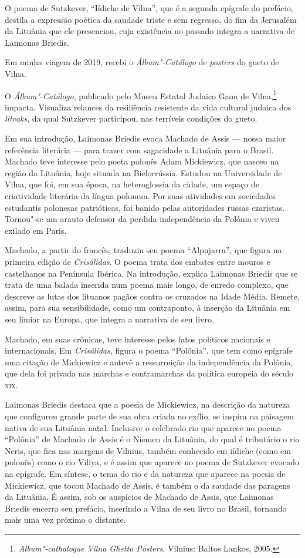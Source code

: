 O poema de Sutzkever, ``Iídiche de Vilna'', que é a segunda epígrafe do
prefácio, destila a expressão poética da saudade triste e sem regresso,
do fim da Jerusalém da Lituânia que ele presenciou, cuja existência no
passado integra a narrativa de Laimonas Briedis.

Em minha viagem de 2019, recebi o \emph{Álbum"-Catálogo} de
\emph{posters} do gueto de Vilna.

O \emph{Álbum"-Catálogo}, publicado pelo Museu Estatal Judaico Gaon de
Vilna,\footnote{\emph{Album"-cathalogue Vilna Ghetto Posters}. Vilnius:
  Baltos Lankos, 2005.} impacta. Visualiza relances da resiliência
resistente da vida cultural judaica dos \emph{litvaks}, da qual
Sutzkever participou, nas terríveis condições do gueto.

Em sua introdução, Laimonas Briedis evoca Machado de Assis --- nossa
maior referência literária --- para trazer com sagacidade a Lituânia para
o Brasil. Machado teve interesse pelo poeta polonês Adam Mickiewicz, que
nasceu na região da Lituânia, hoje situada na Bielorrússia. Estudou na
Universidade de Vilna, que foi, em sua época, na heteroglossia da
cidade, um espaço de criatividade literária da língua polonesa. Por suas
atividades em sociedades estudantis polonesas patrióticas, foi banido
pelas autoridades russas czaristas. Tornou"-se um arauto defensor da
perdida independência da Polônia e viveu exilado em Paris.

Machado, a partir do francês, traduziu seu poema ``Alpujarra'', que
figura na primeira edição de \emph{Crisálidas}. O poema trata dos
embates entre mouros e castelhanos na Península Ibérica. Na introdução,
explica Laimonas Briedis que se trata de uma balada inserida num poema
mais longo, de enredo complexo, que descreve as lutas dos lituanos
pagãos contra os cruzados na Idade Média. Remete, assim, para sua
sensibilidade, como um contraponto, à inserção da Lituânia em seu limiar
na Europa, que integra a narrativa de seu livro.

Machado, em suas crônicas, teve interesse pelos fatos políticos
nacionais e internacionais. Em \emph{Crisálidas}, figura o poema
``Polônia'', que tem como epígrafe uma citação de Mickiewicz e antevê a
ressurreição da independência da Polônia, que dela foi privada nas
marchas e contramarchas da política europeia do século \textsc{xix}.

Laimonas Briedis destaca que a poesia de Mickiewicz, na descrição da
natureza que configurou grande parte de sua obra criada no exílio, se
inspira na paisagem nativa de sua Lituânia natal. Inclusive o celebrado
rio que aparece no poema ``Polônia'' de Machado de Assis é o Niemen da
Lituânia, do qual é tributário o rio Neris, que fica nas margens de
Vilnius, também conhecido em iídiche (como em polonês) como o rio
Viliya, e é assim que aparece no poema de Sutzkever evocado na epígrafe.
Em síntese, o tema do rio e da natureza que aparece na poesia de
Mickiewicz, que tocou Machado de Assis, é também o da saudade das
paragens da Lituânia. É assim, sob os auspícios de Machado de Assis, que
Laimonas Briedis encerra seu prefácio, inserindo a Vilna de seu livro no
Brasil, tornando mais uma vez próximo o distante.

